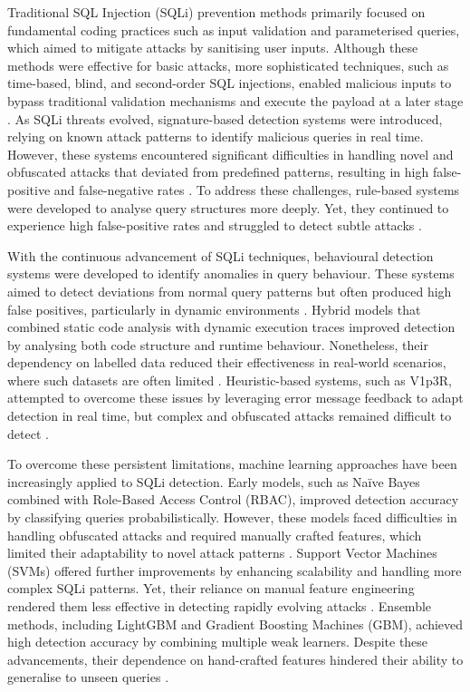 \documentclass[journal]{IEEEtran}
\begin{document}
Traditional SQL Injection (SQLi) prevention methods primarily focused on fundamental coding practices such as input validation and parameterised queries, which aimed to mitigate attacks by sanitising user inputs. Although these methods were effective for basic attacks, more sophisticated techniques, such as time-based, blind, and second-order SQL injections, enabled malicious inputs to bypass traditional validation mechanisms and execute the payload at a later stage \cite{anley2009}. As SQLi threats evolved, signature-based detection systems were introduced, relying on known attack patterns to identify malicious queries in real time. However, these systems encountered significant difficulties in handling novel and obfuscated attacks that deviated from predefined patterns, resulting in high false-positive and false-negative rates \cite{sadeghian2013}. To address these challenges, rule-based systems were developed to analyse query structures more deeply. Yet, they continued to experience high false-positive rates and struggled to detect subtle attacks \cite{halfond2006}.

With the continuous advancement of SQLi techniques, behavioural detection systems were developed to identify anomalies in query behaviour. These systems aimed to detect deviations from normal query patterns but often produced high false positives, particularly in dynamic environments \cite{kiani2008}. Hybrid models that combined static code analysis with dynamic execution traces improved detection by analysing both code structure and runtime behaviour. Nonetheless, their dependency on labelled data reduced their effectiveness in real-world scenarios, where such datasets are often limited \cite{shar2013mining}. Heuristic-based systems, such as V1p3R, attempted to overcome these issues by leveraging error message feedback to adapt detection in real time, but complex and obfuscated attacks remained difficult to detect \cite{ciampa2010heuristic}.

To overcome these persistent limitations, machine learning approaches have been increasingly applied to SQLi detection. Early models, such as Naïve Bayes combined with Role-Based Access Control (RBAC), improved detection accuracy by classifying queries probabilistically. However, these models faced difficulties in handling obfuscated attacks and required manually crafted features, which limited their adaptability to novel attack patterns \cite{joshi2014sql}. Support Vector Machines (SVMs) offered further improvements by enhancing scalability and handling more complex SQLi patterns. Yet, their reliance on manual feature engineering rendered them less effective in detecting rapidly evolving attacks \cite{uwagbole2017applied}. Ensemble methods, including LightGBM and Gradient Boosting Machines (GBM), achieved high detection accuracy by combining multiple weak learners. Despite these advancements, their dependence on hand-crafted features hindered their ability to generalise to unseen queries \cite{farooq2021ensemble}.
\end{document}

